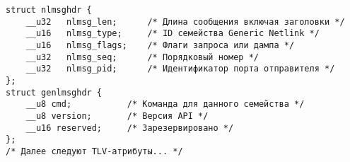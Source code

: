 \begin{verbatim}
struct nlmsghdr {
    __u32   nlmsg_len;      /* Длина сообщения включая заголовки */
    __u16   nlmsg_type;     /* ID семейства Generic Netlink */
    __u16   nlmsg_flags;    /* Флаги запроса или дампа */
    __u32   nlmsg_seq;      /* Порядковый номер */
    __u32   nlmsg_pid;      /* Идентификатор порта отправителя */
};
struct genlmsghdr {
    __u8 cmd;           /* Команда для данного семейства */
    __u8 version;       /* Версия API */
    __u16 reserved;     /* Зарезервировано */
};
/* Далее следуют TLV-атрибуты... */
\end{verbatim}
